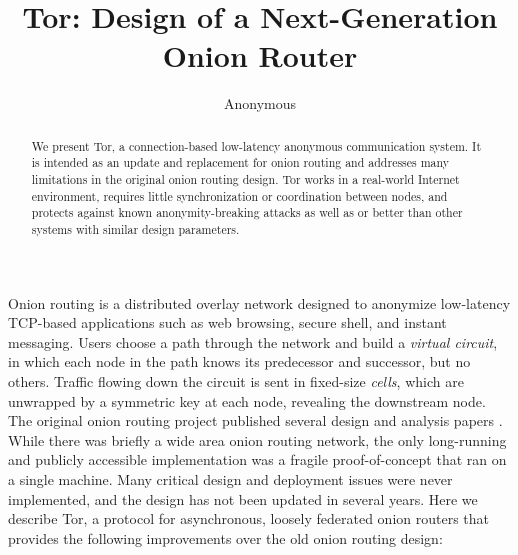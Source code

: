 \documentclass[times,10pt,twocolumn]{article}
\begin{document}

\title{Tor: Design of a Next-Generation Onion Router}

\author{Anonymous}

\maketitle
\thispagestyle{empty}

\begin{abstract}
We present Tor, a connection-based low-latency anonymous communication
system. It is intended as an update and replacement for onion routing
and addresses many limitations in the original onion routing design.
Tor works in a real-world Internet environment,
requires little synchronization or coordination between nodes, and
protects against known anonymity-breaking attacks as well
as or better than other systems with similar design parameters.
\end{abstract}



\label{sec:intro}

Onion routing is a distributed overlay network designed to anonymize
low-latency TCP-based applications such as web browsing, secure shell,
and instant messaging. Users choose a path through the network and
build a \emph{virtual circuit}, in which each node in the path knows its
predecessor and successor, but no others. Traffic flowing down the circuit
is sent in fixed-size \emph{cells}, which are unwrapped by a symmetric key
at each node, revealing the downstream node. The original onion routing
project published several design and analysis papers
\cite{or-jsac98,or-discex00,or-ih96,or-pet02}. While there was briefly
a wide area onion routing network,
the only long-running and publicly accessible
implementation was a fragile proof-of-concept that ran on a single
machine. Many critical design and deployment issues were never implemented,
and the design has not been updated in several years.
Here we describe Tor, a protocol for asynchronous, loosely
federated onion routers that provides the following improvements over
the old onion routing design:
\end{document}
